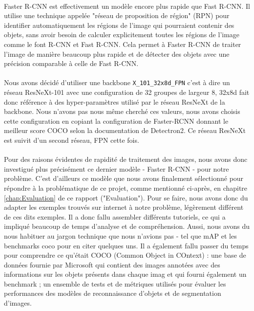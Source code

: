 \paragraph{} Faster R-CNN est effectivement un modèle encore plus rapide que Fast R-CNN. Il utilise une technique appelée "réseau de proposition de région" (RPN) pour identifier automatiquement les régions de l'image qui pourraient contenir des objets, sans avoir besoin de calculer explicitement toutes les régions de l'image comme le font R-CNN et Fast R-CNN. Cela permet à Faster R-CNN de traiter l'image de manière beaucoup plus rapide et de détecter des objets avec une précision comparable à celle de Fast R-CNN.

\paragraph{} Nous avons décidé d'utiliser une backbone \verb|X_101_32x8d_FPN| c'est à dire un réseau ResNeXt-101 avec une configuration de 32 groupes de largeur 8, 32x8d fait donc référence à des hyper-paramètres utilisé par le réseau ResNeXt de la backbone. Nous n'avons pas nous même cherché ces valeurs, nous avons choisis cette configuration en copiant la configuration de Faster-RCNN donnant le meilleur score COCO selon la documentation de Detectron2. Ce réseau ResNeXt est suivit d'un second réseau, FPN cette fois.

\paragraph{} Pour des raisons évidentes de rapidité de traitement des images, nous avons donc investigué plus précisément ce dernier modèle - Faster R-CNN - pour notre problème. C'est d'ailleurs ce modèle que nous avons finalement sélectionné pour répondre à la problématique de ce projet, comme mentionné ci-après, en chapitre \ref{chap:Evaluation} de ce rapport ("Evaluation").\newline
Pour se faire, nous avons donc du adapter les exemples trouvés sur internet à notre problème, légèrement différent de ces dits exemples. Il a donc fallu assembler différents tutoriels, ce qui a impliqué beaucoup de temps d'analyse et de compréhension. Aussi, nous avons du nous habituer au jargon technique que nous n'avions pas - tel que mAP et les benchmarks coco pour en citer quelques uns. Il a également fallu passer du temps pour comprendre ce qu'était COCO (Common Object in COntext) : une base de données fournie par Microsoft qui contient des images annotées avec des informations sur les objets présents dans chaque imag et qui fourni également un benchmark ; un ensemble de tests et de métriques utilisés pour évaluer les performances des modèles de reconnaissance d'objets et de segmentation d'images.

